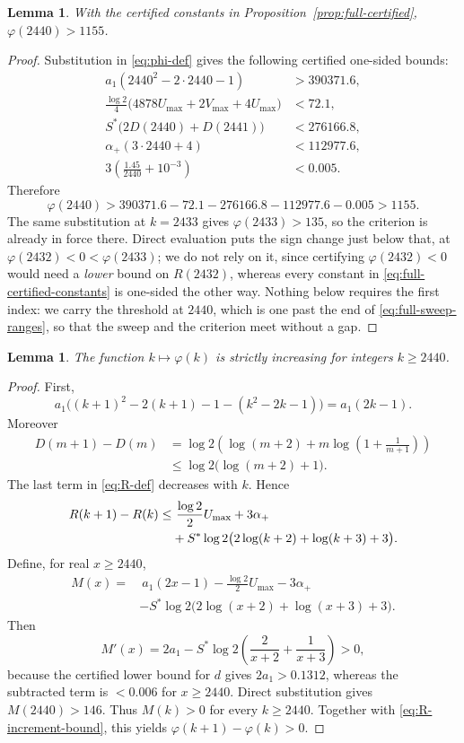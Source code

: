 \documentclass[11pt]{amsart}
\theoremstyle{plain}
\newtheorem{lemma}[theorem]{Lemma}
\theoremstyle{definition}
\begin{document}
\begin{lemma}\label{lem:phi-base}
With the certified constants in Proposition~\ref{prop:full-certified},
$\varphi(2440)>1155$.
\end{lemma}

\begin{proof}
Substitution in \eqref{eq:phi-def} gives the following certified one-sided
bounds:
\begin{align*}
 a_1(2440^2-2\cdot2440-1)&>390371.6,\\
 \frac{\log2}{4}
 \bigl(4878U_{\max}+2V_{\max}+4U_{\max}\bigr)&<72.1,\\
 S^*\bigl(2D(2440)+D(2441)\bigr)&<276166.8,\\
 \alpha_+(3\cdot2440+4)&<112977.6,\\
 3\left(\frac{1.45}{2440}+10^{-3}\right)&<0.005.
\end{align*}
Therefore
\[
 \varphi(2440)
 >390371.6-72.1-276166.8-112977.6-0.005>1155.
\]
The same substitution at $k=2433$ gives $\varphi(2433)>135$, so the criterion
is already in force there. Direct evaluation puts the sign change just below
that, at $\varphi(2432)<0<\varphi(2433)$; we do not rely on it, since certifying
$\varphi(2432)<0$ would need a \emph{lower} bound on $R(2432)$, whereas every
constant in \eqref{eq:full-certified-constants} is one-sided the other way.
Nothing below requires the first index: we carry the threshold at $2440$, which
is one past the end of \eqref{eq:full-sweep-ranges}, so that the sweep and the
criterion meet without a gap.
\end{proof}

\begin{lemma}\label{lem:phi-monotone}
The function $k\mapsto\varphi(k)$ is strictly increasing for integers
$k\geq2440$.
\end{lemma}

\begin{proof}
First,
\[
 a_1\bigl((k+1)^2-2(k+1)-1-(k^2-2k-1)\bigr)=a_1(2k-1).
\]
Moreover
\begin{align*}
 D(m+1)-D(m)
 &=\log2\left(\log(m+2)+m\log\left(1+\frac1{m+1}\right)\right)\\
 &\leq\log2\bigl(\log(m+2)+1\bigr).
\end{align*}
The last term in \eqref{eq:R-def} decreases with $k$. Hence
\begin{align}
 R(k+1)-R(k)
 \leq&\ \frac{\log2}{2}U_{\max}+3\alpha_+\notag\\
 &+S^*\log2\bigl(2\log(k+2)+\log(k+3)+3\bigr).
 \label{eq:R-increment-bound}
\end{align}
Define, for real $x\geq2440$,
\begin{align*}
 M(x)=&\ a_1(2x-1)-\frac{\log2}{2}U_{\max}-3\alpha_+\\
 &-S^*\log2\bigl(2\log(x+2)+\log(x+3)+3\bigr).
\end{align*}
Then
\[
 M'(x)=2a_1-S^*\log2\left(\frac2{x+2}+\frac1{x+3}\right)>0,
\]
because the certified lower bound for $d$ gives $2a_1>0.1312$, whereas the
subtracted term is $<0.006$ for $x\geq2440$. Direct substitution gives
$M(2440)>146$. Thus $M(k)>0$ for every $k\geq2440$. Together with
\eqref{eq:R-increment-bound}, this yields
$\varphi(k+1)-\varphi(k)>0$.
\end{proof}
\end{document}
